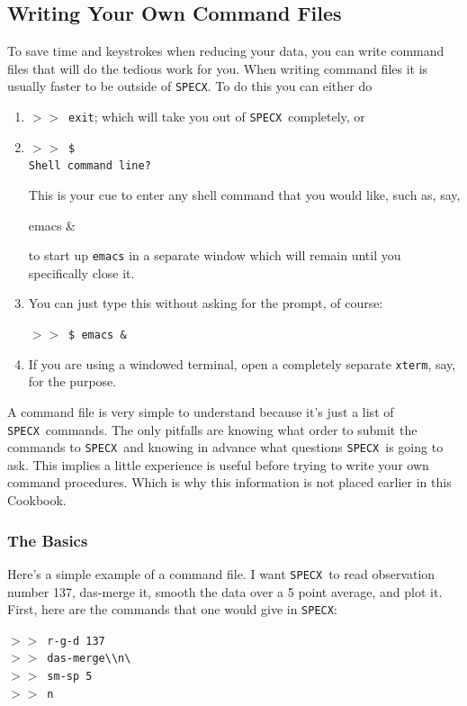 \documentclass[11pt,twoside]{starlink}
\providecommand{\SPECX}{\texttt{SPECX}}
\providecommand{\SP}{{$>\!>$}}
\begin{document}
\subsection{Writing Your Own Command Files}
\label{sec:specx_9}
To save time and keystrokes when reducing your data, you can write
command files that will do the tedious work for you.  When writing
command files it is usually faster to be outside of \SPECX . To do
this you can either do
\begin{enumerate}
\item
\SP\ \verb|exit|; which will take you out of \SPECX\ completely, or
\item
\SP\ \verb|$|\\
\verb|Shell command line?|

This is your cue to enter any shell command that you would like, such
as, say,

\begin{terminalv}
emacs &
\end{terminalv}

to start up \texttt{emacs} in a separate window which will remain until
you specifically close it.
\item
You can just type this without asking for the prompt, of course:

\SP\ \verb|$ emacs &|

\item
If you are using a windowed terminal, open a completely separate \texttt{xterm}, say, for the purpose.
\end{enumerate}

A command file is very simple to understand because it's just a list of
\SPECX\ commands.  The only pitfalls are knowing what order to submit the
commands to \SPECX\ and knowing in advance what questions \SPECX\ is
going to ask. This implies a little experience is useful before trying
to write your own command procedures. Which is why this information is
not placed earlier in this Cookbook.

\subsubsection{The Basics}
\label{sec:specx_9.1}
Here's a simple example of a command file.  I want \SPECX\ to read
observation number 137, das-merge it, smooth the data over a 5 point
average, and plot it.  First, here are the commands that one would
give in \SPECX :

\SP\ \verb|r-g-d 137| \\
\SP\ \verb|das-merge\\n\ | \\
\SP\ \verb|sm-sp 5| \\
\SP\ \verb|n|
\end{document}
